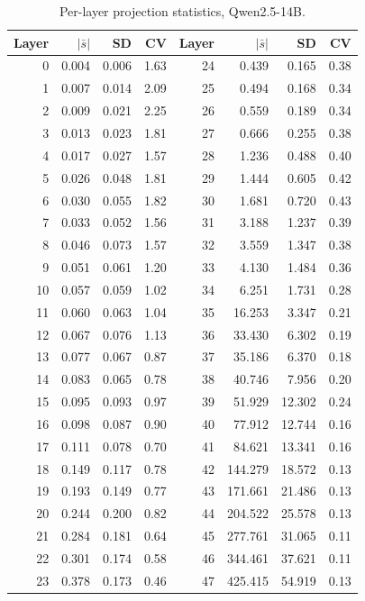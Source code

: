 \begin{table}[t]
  \centering
  \small
  \caption{Per-layer projection statistics, Qwen2.5-14B.}
  \label{tab:cv_qwen14b}
  \begin{tabular}{rrrr@{\hskip 2em}rrrr}
    \toprule
    Layer & $|\bar s|$ & SD & CV & Layer & $|\bar s|$ & SD & CV \\
    \midrule
    0 & 0.004 & 0.006 & 1.63 & 24 & 0.439 & 0.165 & 0.38 \\
    1 & 0.007 & 0.014 & 2.09 & 25 & 0.494 & 0.168 & 0.34 \\
    2 & 0.009 & 0.021 & 2.25 & 26 & 0.559 & 0.189 & 0.34 \\
    3 & 0.013 & 0.023 & 1.81 & 27 & 0.666 & 0.255 & 0.38 \\
    4 & 0.017 & 0.027 & 1.57 & 28 & 1.236 & 0.488 & 0.40 \\
    5 & 0.026 & 0.048 & 1.81 & 29 & 1.444 & 0.605 & 0.42 \\
    6 & 0.030 & 0.055 & 1.82 & 30 & 1.681 & 0.720 & 0.43 \\
    7 & 0.033 & 0.052 & 1.56 & 31 & 3.188 & 1.237 & 0.39 \\
    8 & 0.046 & 0.073 & 1.57 & 32 & 3.559 & 1.347 & 0.38 \\
    9 & 0.051 & 0.061 & 1.20 & 33 & 4.130 & 1.484 & 0.36 \\
    10 & 0.057 & 0.059 & 1.02 & 34 & 6.251 & 1.731 & 0.28 \\
    11 & 0.060 & 0.063 & 1.04 & 35 & 16.253 & 3.347 & 0.21 \\
    12 & 0.067 & 0.076 & 1.13 & 36 & 33.430 & 6.302 & 0.19 \\
    13 & 0.077 & 0.067 & 0.87 & 37 & 35.186 & 6.370 & 0.18 \\
    14 & 0.083 & 0.065 & 0.78 & 38 & 40.746 & 7.956 & 0.20 \\
    15 & 0.095 & 0.093 & 0.97 & 39 & 51.929 & 12.302 & 0.24 \\
    16 & 0.098 & 0.087 & 0.90 & 40 & 77.912 & 12.744 & 0.16 \\
    17 & 0.111 & 0.078 & 0.70 & 41 & 84.621 & 13.341 & 0.16 \\
    18 & 0.149 & 0.117 & 0.78 & 42 & 144.279 & 18.572 & 0.13 \\
    19 & 0.193 & 0.149 & 0.77 & 43 & 171.661 & 21.486 & 0.13 \\
    20 & 0.244 & 0.200 & 0.82 & 44 & 204.522 & 25.578 & 0.13 \\
    21 & 0.284 & 0.181 & 0.64 & 45 & 277.761 & 31.065 & 0.11 \\
    22 & 0.301 & 0.174 & 0.58 & 46 & 344.461 & 37.621 & 0.11 \\
    23 & 0.378 & 0.173 & 0.46 & 47 & 425.415 & 54.919 & 0.13 \\
    \bottomrule
  \end{tabular}
\end{table}
